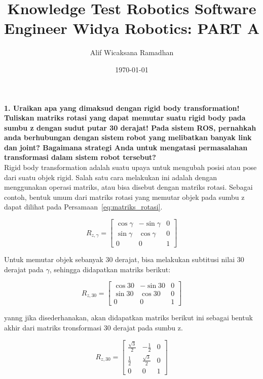 \documentclass[a4paper,12pt]{article}
\title{Knowledge Test Robotics Software Engineer Widya Robotics: PART A}
\author{Alif Wicaksana Ramadhan}
\date{\today}
\begin{document}
\maketitle


\textbf{1. Uraikan apa yang dimaksud dengan rigid body transformation! Tuliskan matriks rotasi yang dapat memutar suatu rigid body pada sumbu z dengan sudut putar 30 derajat! Pada sistem ROS, pernahkah anda berhubungan dengan sistem robot yang melibatkan banyak link dan joint? Bagaimana strategi Anda untuk mengatasi permasalahan transformasi dalam sistem robot tersebut?}\\

Rigid body transformation adalah suatu upaya untuk mengubah posisi atau pose dari suatu objek rigid. Salah satu cara melakukan ini adalah dengan menggunakan operasi matriks, atau bisa disebut dengan matriks rotasi. Sebagai contoh, bentuk umum dari matriks rotasi yang memutar objek pada sumbu z dapat dilihat pada Persamaan~\ref{eq:matriks_rotasi}.

\begin{equation}
    \label{eq:matriks_rotasi}
    R_{z,\gamma} = \begin{bmatrix} \cos \gamma & -\sin \gamma & 0 \\ \sin \gamma & \cos \gamma & 0 \\ 0 & 0 & 1 \end{bmatrix}
\end{equation}

Untuk memutar objek sebanyak 30 derajat, bisa melakukan subtitusi nilai 30 derajat pada $\gamma$, sehingga didapatkan matriks berikut:

\begin{equation}
    R_{z,30} = \begin{bmatrix} \cos 30 & -\sin 30 & 0 \\ \sin 30 & \cos 30 & 0 \\ 0 & 0 & 1 \end{bmatrix}
\end{equation}

yanng jika disederhanakan, akan didapatkan matriks berikut ini sebagai bentuk akhir dari matriks tronsformasi 30 derajat pada sumbu z.

\begin{equation}
    R_{z,30} = \begin{bmatrix} \frac{\sqrt{3}}{2} & -\frac{1}{2} & 0 \\ \frac{1}{2} & \frac{\sqrt{3}}{2} & 0 \\ 0 & 0 & 1 \end{bmatrix}
\end{equation}
\end{document}
